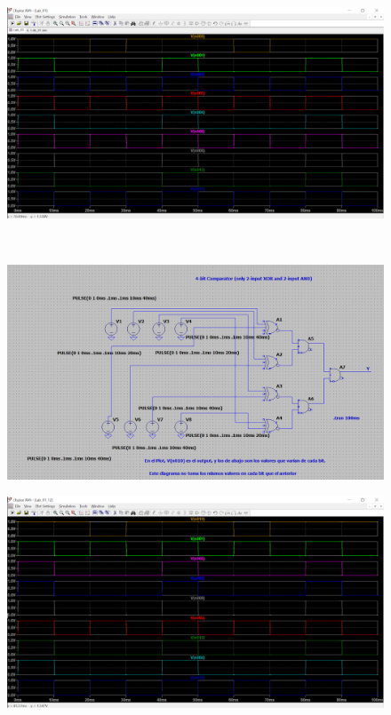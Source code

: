 \documentclass[11pt,a4paper]{article}
\begin{document}
\begin{enumerate}
\begin{figure}[h!]
\end{figure}
\\
\begin{figure}[h!]
\centering
\includegraphics[scale=0.2]{plot11.png} 
\end{figure}
\\
\begin{figure}[h!]
\centering
\includegraphics[scale=0.24]{dia12.png} 
\end{figure}
\begin{figure}[h!]
\centering
\includegraphics[scale=0.2]{plot12.png} 
\end{figure}


\end{enumerate}
\end{document}
